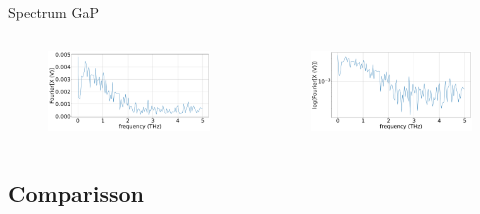 \documentclass[aspectratio=1610, 9pt]{beamer}
\begin{document}
\begin{frame}{Spectrum GaP}
  \begin{columns}
    \begin{column}{.5\textwidth}
  \begin{figure}
    \includegraphics[width=\textwidth]{images/GaP14_55_42normalFX.pdf}
  \end{figure}
  \end{column}
  \begin{column}{.5\textwidth}
    \begin{figure}
      \includegraphics[width=\textwidth]{images/GaP14_55_42normallog(FX).pdf}
    \end{figure}    
  \end{column}
  \end{columns}
\end{frame}

\subsection{Comparisson}
\end{document}

